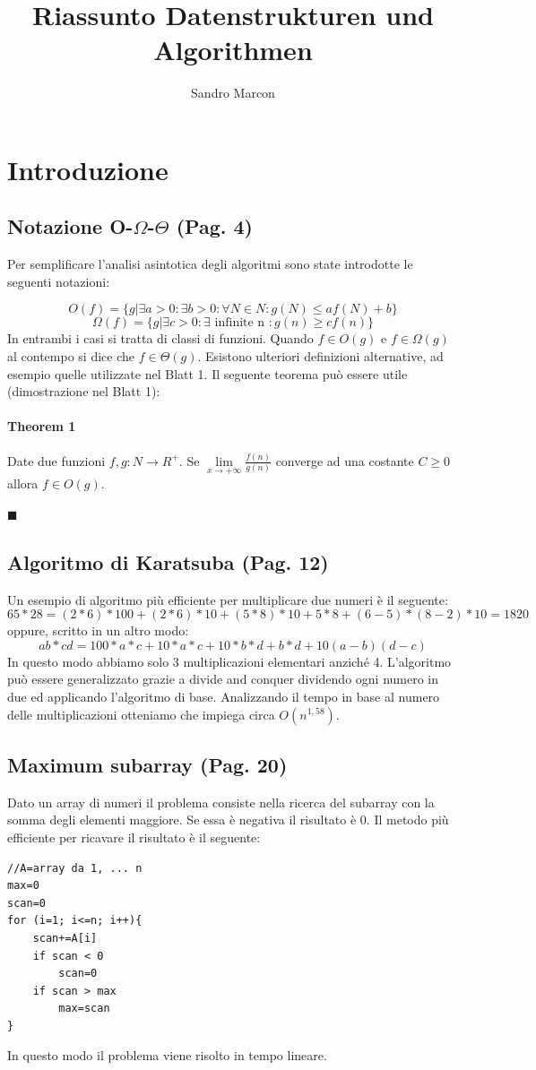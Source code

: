 \documentclass[a4paper]{book}
\author{Sandro Marcon}
\title{Riassunto Datenstrukturen und Algorithmen}
\newenvironment{mytheorem}[1]{\subsubsection*{Theorem #1}}{\begin{flushright}$\blacksquare$\end{flushright}}
\begin{document}
\maketitle

\frontmatter
\tableofcontents %
\mainmatter
\chapter{Introduzione}
\section{Notazione O-$\Omega$-$\Theta$ (Pag. 4)}
Per semplificare l'analisi asintotica degli algoritmi sono state introdotte le 
seguenti notazioni:

$$O(f)=\{ g|\exists a>0: \exists b>0: \forall N \in N : g(N)\leq af(N)+b \}$$
$$\Omega (f)=\{ g|\exists c>0: \exists \mbox{ infinite n } : g(n) \geq cf(n) \}$$
In entrambi i casi si tratta di classi di funzioni. Quando $f \in O(g)$ e $f \in \Omega (g)$ al contempo si dice che $f \in \Theta (g)$. Esistono ulteriori definizioni alternative, ad esempio quelle utilizzate nel Blatt 1. Il seguente teorema può essere utile (dimostrazione nel Blatt 1):
\newtheorem{theorem}{Theorem}
\begin{mytheorem}{1}
Date due funzioni $ f,g: N \rightarrow R^{+} $. Se $ \lim\limits_{x \rightarrow +\infty} \frac{f(n)}{g(n)} $ converge ad una costante $C\geq 0$ allora $f \in O(g)$.
\end{mytheorem}
\section{Algoritmo di Karatsuba (Pag. 12)}
Un esempio di algoritmo più efficiente per multiplicare due numeri è il seguente:
$$65 * 28 = (2 * 6) * 100 + (2 * 6) * 10 + (5 * 8) * 10 + 5 * 8 + (6-5)*(8-2) * 10 = 1820 $$
oppure, scritto in un altro modo:
\[ab*cd=100*a*c+10*a*c+10*b*d+b*d+10(a-b)(d-c)\]
In questo modo abbiamo solo 3 multiplicazioni elementari anziché 4. L'algoritmo può essere generalizzato grazie a divide and conquer dividendo ogni numero in due ed applicando l'algoritmo di base. Analizzando il tempo in base al numero delle multiplicazioni otteniamo che impiega circa $O(n^{1,58})$.
\section{Maximum subarray (Pag. 20)}
Dato un array di numeri il problema consiste nella ricerca del subarray con la somma degli elementi maggiore. Se essa è negativa il risultato è 0. Il metodo più efficiente per ricavare il risultato è il seguente:
\begin{lstlisting}[tabsize=4]
//A=array da 1, ... n	
max=0	
scan=0
for (i=1; i<=n; i++){	
	scan+=A[i]
	if scan < 0
		scan=0
	if scan > max 
		max=scan
}			
\end{lstlisting}
In questo modo il problema viene risolto in tempo lineare.	
\end{document}
